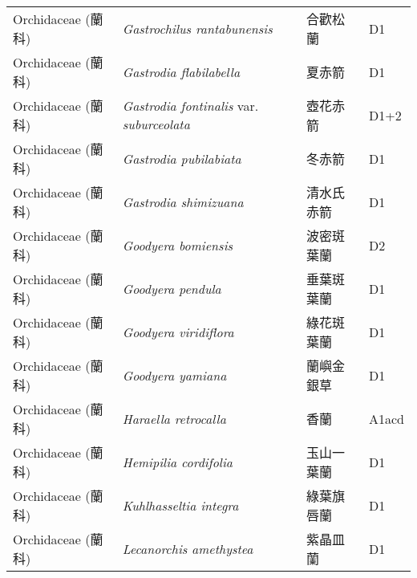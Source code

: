 \begin{longtable}{p{3cm}p{5cm}p{3cm}p{4cm}}
    Orchidaceae (蘭科) & \textit{Gastrochilus rantabunensis}  & 合歡松蘭 & D1 \index{Gastrochilus@\textit{Gastrochilus}!rantabunensis@\textit{rantabunensis}}  \index{合歡松蘭} \\
    Orchidaceae (蘭科) & \textit{Gastrodia flabilabella}  & 夏赤箭 & D1 \index{Gastrodia@\textit{Gastrodia}!flabilabella@\textit{flabilabella}}  \index{夏赤箭} \\
    Orchidaceae (蘭科) & \textit{Gastrodia fontinalis} var. \textit{suburceolata}  & 壺花赤箭 & D1+2 \index{Gastrodia@\textit{Gastrodia}!fontinalis@\textit{fontinalis}!var. suburceolata@var. \textit{suburceolata}}  \index{壺花赤箭} \\
    Orchidaceae (蘭科) & \textit{Gastrodia pubilabiata}  & 冬赤箭 & D1 \index{Gastrodia@\textit{Gastrodia}!pubilabiata@\textit{pubilabiata}}  \index{冬赤箭} \\
    Orchidaceae (蘭科) & \textit{Gastrodia shimizuana}  & 清水氏赤箭 & D1 \index{Gastrodia@\textit{Gastrodia}!shimizuana@\textit{shimizuana}}  \index{清水氏赤箭} \\
    Orchidaceae (蘭科) & \textit{Goodyera bomiensis}  & 波密斑葉蘭 & D2 \index{Goodyera@\textit{Goodyera}!bomiensis@\textit{bomiensis}}  \index{波密斑葉蘭} \\
    Orchidaceae (蘭科) & \textit{Goodyera pendula}  & 垂葉斑葉蘭 & D1 \index{Goodyera@\textit{Goodyera}!pendula@\textit{pendula}}  \index{垂葉斑葉蘭} \\
    Orchidaceae (蘭科) & \textit{Goodyera viridiflora}  & 綠花斑葉蘭 & D1 \index{Goodyera@\textit{Goodyera}!viridiflora@\textit{viridiflora}}  \index{綠花斑葉蘭} \\
    Orchidaceae (蘭科) & \textit{Goodyera yamiana}  & 蘭嶼金銀草 & D1 \index{Goodyera@\textit{Goodyera}!yamiana@\textit{yamiana}}  \index{蘭嶼金銀草} \\
    Orchidaceae (蘭科) & \textit{Haraella retrocalla}  & 香蘭 & A1acd \index{Haraella@\textit{Haraella}!retrocalla@\textit{retrocalla}}  \index{香蘭} \\
    Orchidaceae (蘭科) & \textit{Hemipilia cordifolia}  & 玉山一葉蘭 & D1 \index{Hemipilia@\textit{Hemipilia}!cordifolia@\textit{cordifolia}}  \index{玉山一葉蘭} \\
    Orchidaceae (蘭科) & \textit{Kuhlhasseltia integra}  & 綠葉旗唇蘭 & D1 \index{Kuhlhasseltia@\textit{Kuhlhasseltia}!integra@\textit{integra}}  \index{綠葉旗唇蘭} \\
    Orchidaceae (蘭科) & \textit{Lecanorchis amethystea}  & 紫晶皿蘭 & D1 \index{Lecanorchis@\textit{Lecanorchis}!amethystea@\textit{amethystea}}  \index{紫晶皿蘭} \\

\end{longtable}
